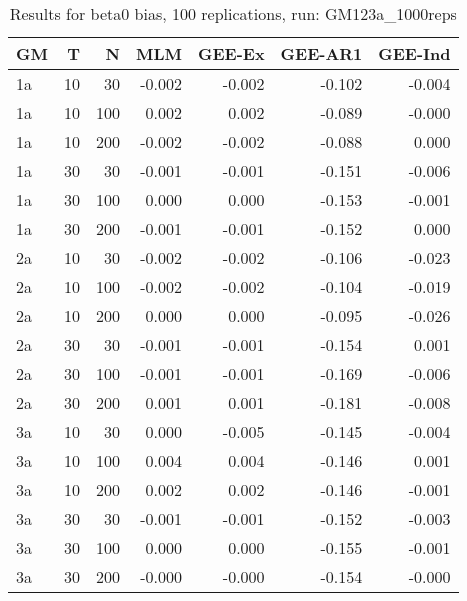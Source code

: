 \begin{table}[ht]
\centering
\begin{tabular}{lrrrrrr}
  \hline
GM & T & N & MLM & GEE-Ex & GEE-AR1 & GEE-Ind \\ 
  \hline
1a & 10 & 30 & -0.002 & -0.002 & -0.102 & -0.004 \\ 
  1a & 10 & 100 & 0.002 & 0.002 & -0.089 & -0.000 \\ 
  1a & 10 & 200 & -0.002 & -0.002 & -0.088 & 0.000 \\ 
  1a & 30 & 30 & -0.001 & -0.001 & -0.151 & -0.006 \\ 
  1a & 30 & 100 & 0.000 & 0.000 & -0.153 & -0.001 \\ 
  1a & 30 & 200 & -0.001 & -0.001 & -0.152 & 0.000 \\ 
   \hline
2a & 10 & 30 & -0.002 & -0.002 & -0.106 & -0.023 \\ 
  2a & 10 & 100 & -0.002 & -0.002 & -0.104 & -0.019 \\ 
  2a & 10 & 200 & 0.000 & 0.000 & -0.095 & -0.026 \\ 
  2a & 30 & 30 & -0.001 & -0.001 & -0.154 & 0.001 \\ 
  2a & 30 & 100 & -0.001 & -0.001 & -0.169 & -0.006 \\ 
  2a & 30 & 200 & 0.001 & 0.001 & -0.181 & -0.008 \\ 
   \hline
3a & 10 & 30 & 0.000 & -0.005 & -0.145 & -0.004 \\ 
  3a & 10 & 100 & 0.004 & 0.004 & -0.146 & 0.001 \\ 
  3a & 10 & 200 & 0.002 & 0.002 & -0.146 & -0.001 \\ 
  3a & 30 & 30 & -0.001 & -0.001 & -0.152 & -0.003 \\ 
  3a & 30 & 100 & 0.000 & 0.000 & -0.155 & -0.001 \\ 
  3a & 30 & 200 & -0.000 & -0.000 & -0.154 & -0.000 \\ 
   \hline
\end{tabular}
\caption{Results for beta0 bias, 100 replications, run: GM123a_1000reps} 
\label{tab:beta0_bias}
\end{table}
